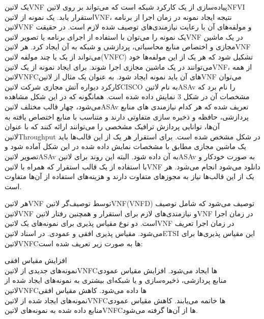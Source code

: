 \documentclass{book}
\begin{document}
یک ‌لاتین{VNF} پیاده‌سازی از یک کارکرد شبکه است که می‌تواند بر روی ‌لاتین{NFVI} استقرار یابد.
یک نمونه از ‌لاتین{VNF}، نتیجه ایجاد نمونه در زمان اجرا از برنامه ‌لاتین{VNF} و مولفه‌های آن با رعایت نیازمندی‌های توصیف شده لازم است.
در حقیقت یک نمونه را می‌توان با استفاده از اجرای برنامه یا تصویر ‌لاتین{VNF} در یک ماشین مجازی و اختصاص منابع محاسباتی، پردازشی و شبکه به آن ایجاد کرد.
هر ‌لاتین{VNF} می‌تواند از یک یا چند مولفه ‌لاتین{(VNFC)} تشکیل شود که هر یک از این مولفه‌ها خود می‌توانند در یک ماشین مجازی اجرا شوند.
برای ایجاد نمونه از یک ‌لاتین{VNF}، از همه ‌لاتین{VNFC}های آن باید نمونه ایجاد شود.
به عنوان یک مثال از ‌لاتین{VNF} می‌توان کارکرد دیواره آتش مجازی شرکت ‌لاتین{CISCO} به نام ‌لاتین{ASAv} را نام برد که مشخصات آن در شکل 3 نمایش داده شده است.
همانگونه که در این شکل مشاهده می‌شود، چهار قالب مختلف ‌لاتین{ASAv} تعریف شده که هر کدام نیازمندی های منابع پردازشی، حافظه و ذخیره سازی متفاوتی دارند و متناسب با منابع اختصاص یافته به آن‌ها،
توانایی پردازش ترافیک مشخصی را می‌توانند ارائه کنند که با عنوان ‌لاتین{Throughput} در شکل مشخص شده است. برای استقرار هر یک از این قالب‌ها باید یک ماشین مجازی مطابق با
مشخصات نمایش داده شده در این شکل آماده شود و تصویر ‌لاتین{ASAv} به آن داده شود.
البته این روند برای ‌لاتین{ASAv} به صورت خودکار و با استفاده از یک قالب استقرار که همراه با ‌لاتین{VNF} دانلود می‌شود انجام می‌شود.
هر یک از این قالب‌ها نیاز به مجوزهای متفاوت دارند و هزینه‌های استفاده از آن‌ها متفاوت است.

هر ‌لاتین{VNF} توسط توصیف‌گر ‌لاتین{VNF(VNFD)} توصیف می‌شود که شامل توصیف ‌لاتین{VNF} و
نیازمندی‌های لازم برای استقرار و همچنین رفتار ‌لاتین{VNF} در زمان اجرا است.
دو نوع مقیاس پذیری برای نمونه‌های یک ‌لاتین{VNF} در زمان اجرا تعریف می‌شود. مقیاس پذیری افقی و عمودی. در اسناد ‌لاتین{ETSI} این مقیاس پذیری‌ها برای ‌لاتین{VNFC}ها به صورت زیر تعریف شده است:


 افزایش مقیاس افقی\\ نمونه‌های جدیدی از ‌لاتین{VNFC}ها ایجاد می‌شود.
 افزایش مقیاس عمودی\\ منابع پردازشی، ذخیره‌سازی و یا شبکه‌ای بیشتری به نمونه‌های ایجاد شده از ‌لاتین{VNFC}ها داده می‌شود.
 کاهش مقیاس افقی\\ نمونه‌های ایجاد شده از ‌لاتین{VNFC}ها خاتمه می‌یابند.
 کاهش مقیاس عمودی\\ منابع داده شده به نمونه‌های ‌لاتین{VNFC}ها از آن‌ها گرفته می‌شود.
\end{document}
